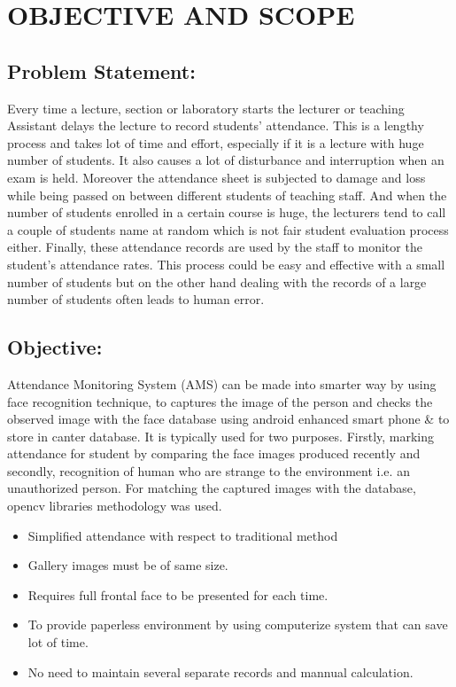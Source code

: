 \chapter{OBJECTIVE AND SCOPE}
\section{Problem Statement: }

Every time a lecture, section or laboratory starts the lecturer or teaching Assistant delays the lecture to record students’ attendance. This is a lengthy process and takes lot of time and effort, especially if it is a lecture with huge number of students. It also causes a lot of disturbance and interruption when an exam is held. Moreover the attendance sheet is subjected to damage and loss while being passed on between different students of teaching staff. And when the number of students enrolled in a certain course is huge, the lecturers tend to call a couple of students name at random which is not fair student evaluation process either. Finally, these attendance records are used by the staff to monitor the student’s attendance rates. This process could be easy and effective with a small number of students but on the other hand dealing with the records of a large number of students often leads to human error. \cite{priti}

\section{Objective: }
Attendance Monitoring System (AMS) can be made into smarter way by using face recognition technique, to captures the image of the person and checks the observed image with the face database using android enhanced smart phone \& to store in canter database.
It is typically used for two purposes. Firstly, marking attendance for student by comparing the face images produced recently and secondly, recognition of human who are strange to the environment i.e. an unauthorized person. For matching the captured images with the database, opencv libraries methodology was used.\cite{pdya} 
\newpage
\begin{itemize}
     \item    Simplified attendance with respect to traditional method 
     \item    Gallery images must be of same size.
      \item   Requires full frontal face to be presented for each time.
      \item    To provide paperless environment by using computerize system that can save lot of time. 
    \item      No need to maintain several separate records and mannual calculation.
\end{itemize}
           
